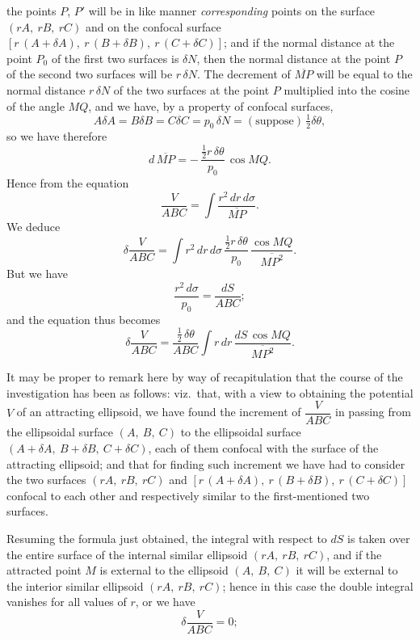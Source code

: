 \documentclass[11pt]{article}
\begin{document}
\medskip

\noindent the points $P$, $P'$ will be in like manner \emph{corresponding} points on the surface $(r A,\ r B,\ r C)$ and on the confocal surface $[r\,(A + \delta A),\ r\,(B + \delta B),\ r\,(C + \delta C)]$; and if the normal distance at the point $P_{0}$ of the first two surfaces is $\delta N$, then the normal distance at the point $P$ of the second two surfaces will be $r\,\delta N$. The decrement of $\overline{MP}$ will be equal to the normal distance $r\,\delta N$ of the two surfaces at the point $P$ multiplied into the cosine of the angle $MQ$, and we have, by a property of confocal surfaces,
\[
A\delta A = B\delta B = C\delta C = p_{0}\,\delta N = (\text{suppose})\,\tfrac{1}{2}\delta\theta,
\]
so we have therefore
\[
d\,\overline{MP} = -\,\frac{\tfrac{1}{2} r\,\delta\theta}{p_{0}}\,\cos MQ.
\]
Hence from the equation
\[
\frac{V}{A B C} = \int\frac{r^{2}\,dr\,d\sigma}{\overline{MP}}.
\]
We deduce
\[
\delta\frac{V}{A B C} = \int r^{2}\,dr\,d\sigma\,\frac{\tfrac{1}{2} r\,\delta\theta}{p_{0}}\,\frac{\cos MQ}{\overline{MP^{2}}}.
\]
But we have
\[
\frac{r^{2}\,d\sigma}{p_{0}} = \frac{dS}{A B C};
\]
and the equation thus becomes
\[
\delta\frac{V}{A B C} = \frac{\tfrac{1}{2}\,\delta\theta}{A B C}\int r\,dr\,\frac{dS\,\cos MQ}{\overline{MP^{2}}}.
\]

It may be proper to remark here by way of recapitulation that the course of the investigation has been as follows: viz.\ that, with a view to obtaining the potential $V$ of an attracting ellipsoid, we have found the increment of $\dfrac{V}{A B C}$ in passing from the ellipsoidal surface $(A,\ B,\ C)$ to the ellipsoidal surface $(A + \delta A,\ B + \delta B,\ C + \delta C)$, each of them confocal with the surface of the attracting ellipsoid; and that for finding such increment we have had to consider the two surfaces $(r A,\ r B,\ r C)$ and $[r\,(A + \delta A),\ r\,(B + \delta B),\ r\,(C + \delta C)]$ confocal to each other and respectively similar to the first-mentioned two surfaces.

Resuming the formula just obtained, the integral with respect to $dS$ is taken over the entire surface of the internal similar ellipsoid $(r A,\ r B,\ r C)$, and if the attracted point $M$ is external to the ellipsoid $(A,\ B,\ C)$ it will be external to the interior similar ellipsoid $(r A,\ r B,\ r C)$; hence in this case the double integral vanishes for all values of $r$, or we have
\[
\delta\frac{V}{A B C} = 0;
\]

\newpage
\end{document}

